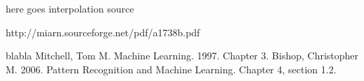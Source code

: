 \documentclass[a4paper, 10pt, conference]{ieeeconf}      %
\begin{document}









\begin{thebibliography}{}
 here goes interpolation source

 http://miarn.sourceforge.net/pdf/a1738b.pdf

blabla
 Mitchell, Tom M. Machine Learning. 1997. Chapter 3.
 Bishop, Christopher M. 2006. Pattern Recognition and Machine Learning. Chapter 4, section 1.2.
\end{thebibliography}
\end{document}
